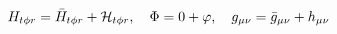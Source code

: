 \begin{equation}
H_{t \phi r} = \bar H_{t \phi r} + {\cal H}_{t \phi r},~~~
\Phi = 0 + \varphi,~~~
g_{\mu\nu} = \bar g_{\mu\nu} + h_{\mu\nu}
\label{per}
\end{equation}

